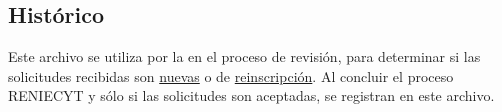 

\subsection{Histórico}
\label{appendix:Reportes:DireccionRENIECYT:Historico}

Este archivo se utiliza por la  en el proceso de revisión, para determinar si las solicitudes recibidas son \hyperref[glosario:SolicitudNueva]{nuevas} o de \hyperref[glosario:SolicitudDeReinscripcion]{reinscripción}. Al concluir el proceso RENIECYT y sólo si las solicitudes son aceptadas, se registran en este archivo.\\

